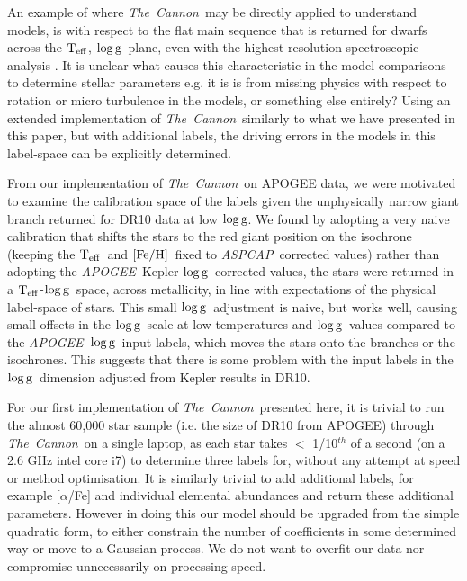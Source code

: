 \documentclass[12pt, preprint]{aastex}
\newcommand{\teff}{\mbox{$\rm T_{eff}$}}
\newcommand{\feh}{\mbox{$\rm [Fe/H]$}}
\newcommand{\logg}{\mbox{$\rm \log g$}}
\newcommand{\tc}{\textsl{The~Cannon}}
\newcommand{\apogee}{\textsl{APOGEE}}
\newcommand{\aspcap}{\textsl{ASPCAP}}
\begin{document}
An example of where \tc\ may be directly applied to understand models, is with respect to the flat main sequence that is returned for dwarfs across the \teff, \logg\ plane, even with the highest resolution spectroscopic analysis \citep[e.g.][]{bensby2013}. It is unclear what causes this characteristic  in the model comparisons to determine stellar parameters e.g. it is is from missing physics with respect to rotation or micro turbulence in the models, or something else entirely? Using an extended implementation of \tc\ similarly to what we have presented in this paper, but with additional labels, the driving errors in the models in this label-space can be explicitly determined.

From our implementation of \tc\ on APOGEE data, we were motivated to examine the calibration space of the labels given the unphysically narrow giant branch returned for DR10 data at low \logg. We found by adopting a very naive calibration that shifts the stars to the red giant position on the isochrone (keeping the \teff\ and \feh\ fixed to \aspcap\ corrected values) rather than adopting the \apogee\ Kepler \logg\ corrected values, the stars were returned in a \teff-\logg\ space, across metallicity, in line with expectations of the physical label-space of stars. This small \logg\ adjustment is naive, but works well, causing small offsets in the \logg\ scale at low temperatures and \logg\ values compared to the \apogee\ \logg\ input labels, which moves the stars onto the branches or the isochrones. This suggests that there is some problem with the input labels in the \logg\ dimension adjusted from Kepler results in DR10. 

 For our first implementation of \tc\ presented here, it is trivial to run the almost 60,000 star sample (i.e. the size of DR10 from APOGEE) through \tc\ on a single laptop, as each star takes $<$ 1/10$^{th}$ of a second (on a 2.6 GHz intel core i7) to determine three labels for, without any attempt at speed or method optimisation. It is similarly trivial to add additional labels, for example [$\alpha$/Fe] and individual elemental abundances and return these additional parameters. However in doing this our model should be upgraded from the simple quadratic form, to either constrain the number of coefficients in some determined way or move to a Gaussian process. We do not want to overfit our data nor compromise unnecessarily on processing speed.  
 
\end{document}

